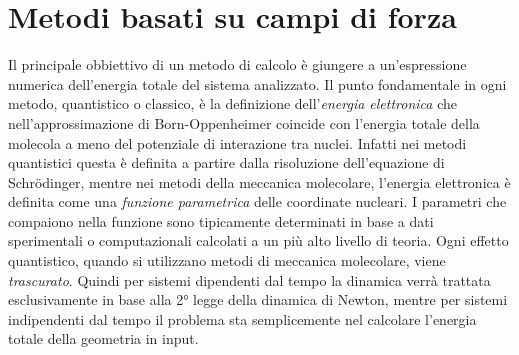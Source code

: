 \documentclass[oneside]{amsbook}
\numberwithin{section}{chapter}
\numberwithin{equation}{section}
\numberwithin{figure}{section}
\begin{document}
\chapter{Metodi basati su campi di forza}
Il principale obbiettivo di un metodo di calcolo è giungere a un'espressione numerica dell'energia totale del sistema analizzato. Il punto fondamentale in ogni metodo, quantistico o classico, è la definizione dell'\emph{energia elettronica} che nell'approssimazione di Born-Oppenheimer coincide con l'energia totale della molecola a meno del potenziale di interazione tra nuclei. Infatti nei metodi quantistici questa è definita a partire dalla risoluzione dell'equazione di Schr\"{o}dinger, mentre nei metodi della meccanica molecolare, l'energia elettronica è definita come una \emph{funzione parametrica} delle coordinate nucleari. I parametri che compaiono nella funzione sono tipicamente determinati in base a  dati sperimentali o computazionali calcolati a un più alto livello di teoria.
Ogni effetto quantistico, quando si utilizzano metodi di meccanica molecolare, viene \emph{trascurato}. Quindi per sistemi dipendenti dal tempo la dinamica verrà trattata esclusivamente in base alla 2° legge della dinamica di Newton, mentre per sistemi indipendenti dal tempo il problema sta semplicemente nel calcolare l'energia totale della geometria in input.
\end{document}
